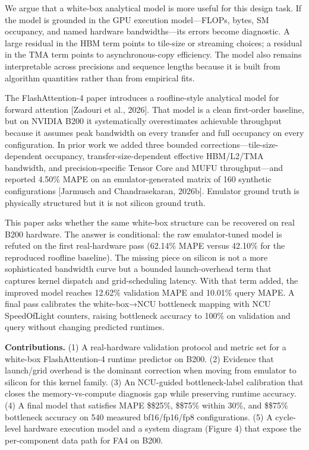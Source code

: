 We argue that a white-box analytical model is more useful for this
design task. If the model is grounded in the GPU execution
model---FLOPs, bytes, SM occupancy, and named hardware bandwidths---its
errors become diagnostic. A large residual in the HBM term points to
tile-size or streaming choices; a residual in the TMA term points to
asynchronous-copy efficiency. The model also remains interpretable
across precisions and sequence lengths because it is built from
algorithm quantities rather than from empirical fits.

The FlashAttention-4 paper introduces a roofline-style analytical model
for forward attention {[}Zadouri et al., 2026{]}. That model is a clean
first-order baseline, but on NVIDIA B200 it systematically overestimates
achievable throughput because it assumes peak bandwidth on every
transfer and full occupancy on every configuration. In prior work we
added three bounded corrections---tile-size-dependent occupancy,
transfer-size-dependent effective HBM/L2/TMA bandwidth, and
precision-specific Tensor Core and MUFU throughput---and reported 4.50\%
MAPE on an emulator-generated matrix of 160 synthetic configurations
{[}Jarmusch and Chandrasekaran, 2026b{]}. Emulator ground truth is
physically structured but it is not silicon ground truth.

This paper asks whether the same white-box structure can be recovered on
real B200 hardware. The answer is conditional: the raw emulator-tuned
model is refuted on the first real-hardware pass (62.14\% MAPE versus
42.10\% for the reproduced roofline baseline). The missing piece on
silicon is not a more sophisticated bandwidth curve but a bounded
launch-overhead term that captures kernel dispatch and grid-scheduling
latency. With that term added, the improved model reaches 12.62\%
validation MAPE and 10.01\% query MAPE. A final pass calibrates the
white-box→NCU bottleneck mapping with NCU SpeedOfLight counters, raising
bottleneck accuracy to 100\% on validation and query without changing
predicted runtimes.

\textbf{Contributions.} (1) A real-hardware validation protocol and
metric set for a white-box FlashAttention-4 runtime predictor on B200.
(2) Evidence that launch/grid overhead is the dominant correction when
moving from emulator to silicon for this kernel family. (3) An
NCU-guided bottleneck-label calibration that closes the
memory-vs-compute diagnosis gap while preserving runtime accuracy. (4) A
final model that satisfies MAPE \$\le\$25\%, \$\ge\$75\% within 30\%,
and \$\ge\$75\% bottleneck accuracy on 540 measured bf16/fp16/fp8
configurations. (5) A cycle-level hardware execution model and a system
diagram (Figure 4) that expose the per-component data path for FA4 on
B200.


